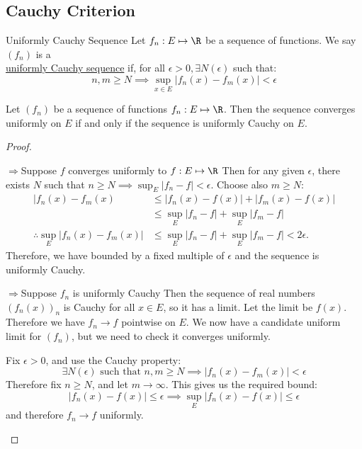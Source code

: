\documentclass[../Main.tex]{subfiles}
\begin{document}
\subsection{Cauchy Criterion}
\begin{definition}{Uniformly Cauchy Sequence}
    Let $f_n : E \mapsto \R$ be a sequence of functions. We say $(f_n)$ is a\\\underline{uniformly Cauchy sequence} if, for all $\epsilon > 0, \exists N(\epsilon)$ such that:
    \begin{equation}
        n, m \geq N \implies \sup_{x \in E} |f_n(x) - f_m(x)| < \epsilon
        \label{eqnSequenceCauchy}
    \end{equation}
\end{definition}
\begin{theorem}
    Let $(f_n)$ be a sequence of functions $f_n : E \mapsto \R$. Then the sequence converges uniformly on $E$ if and only if the sequence is uniformly Cauchy on $E$.
    \label{thmCauchyCriterion}
\end{theorem}
\begin{proof}
    \begin{proofdirection}{$\Rightarrow$}{Suppose $f$ converges uniformly to $f : E \mapsto \R$}
        Then for any given $\epsilon$, there exists $N$ such that $n \geq N \implies \sup_{E} |f_n - f| < \epsilon$.
        Choose also $m \geq N$:
        \begin{align*}
            |f_n(x) - f_m(x) &\leq |f_n(x) - f(x)| + |f_m(x) - f(x)| \\
            &\leq \sup_E |f_n - f| + \sup_E |f_m - f| \\
            \therefore \sup_E |f_n(x) - f_m(x)| &\leq \sup_E |f_n - f| + \sup_E |f_m - f| < 2\epsilon.
        \end{align*}
        Therefore, we have bounded by a fixed multiple of $\epsilon$ and the sequence is uniformly Cauchy.
    \end{proofdirection}
    \begin{proofdirection}{$\Rightarrow$}{Suppose $f_n$ is uniformly Cauchy}
        Then the sequence of real numbers $(f_n(x))_n$ is Cauchy for all $x \in E$, so it has a limit. Let the limit be $f(x)$. Therefore we have $f_n \to f$ pointwise on $E$. We now have a candidate uniform limit for $(f_n)$, but we need to check it converges uniformly.

        Fix $\epsilon > 0$, and use the Cauchy property:
        \begin{equation*}
            \exists N(\epsilon) \text{ such that } n, m \geq N \implies |f_n(x) - f_m(x)| < \epsilon
        \end{equation*}
        Therefore fix $n \geq N$, and let $m \to \infty$. This gives us the required bound:
        \begin{equation*}
            |f_n(x) - f(x)| \leq \epsilon \implies \sup_E |f_n(x) - f(x)| \leq \epsilon
        \end{equation*}
        and therefore $f_n \to f$ uniformly.
    \end{proofdirection}
\end{proof}
\end{document}
